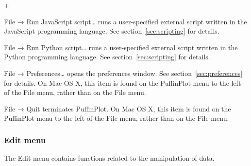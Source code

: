 \documentclass[a4paper,british]{article}
\newcommand{\menuitemlabel}[1]{%
\mbox{\textsf{#1}}\hfil}
\newenvironment{menuitemlist}%
{\begin{list}{}{%
\renewcommand{\makelabel}{\menuitemlabel}%
\setlength{\labelwidth}{35pt}%
\setlength{\leftmargin}%
             {\labelwidth+\labelsep}}}%
{\end{list}}
\newcommand{\ppcmd}[1]{\textsf{#1}} %
\newcommand{\submenu}{ \textrm{→} }
\begin{document}
\begin{menuitemlist}
\item[File\submenu Run JavaScript script\ldots] runs a user-specified
  external script written in the JavaScript programming language.
  See section~\ref{sec:scripting} for details.

\item[File\submenu Run Python script\ldots] runs a user-specified
  external script written in the Python programming language.
  See section~\ref{sec:scripting} for details.

\item[File\submenu Preferences\ldots] opens the preferences window. See
  section~\ref{sec:preferences} for details. On Mac OS X, this item is found
  on the \ppcmd{PuffinPlot} menu to the left of the \ppcmd{File} menu, rather
  than on the \ppcmd{File} menu.

\item[File\submenu Quit] terminates PuffinPlot. On Mac OS X, this item is
  found on the \ppcmd{PuffinPlot} menu to the left of the \ppcmd{File} menu,
  rather than on the \ppcmd{File} menu.

\end{menuitemlist}

\subsubsection{Edit menu}

The \ppcmd{Edit} menu contains functions related to the manipulation
of data.
\end{document}
